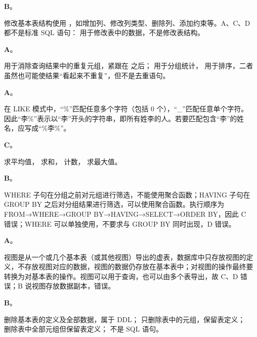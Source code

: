 \documentclass[a4paper,11pt]{article}
\begin{document}


\q \textbf{B}。\begin{analysis}修改基本表结构使用 ，如增加列、修改列类型、删除列、添加约束等。A、C、D 都不是标准 SQL 语句： 用于修改表中的数据，不是修改表结构。\end{analysis}

\q \textbf{A}。\begin{analysis} 用于消除查询结果中的重复元组，紧跟在  之后； 用于分组统计， 用于排序，二者虽然也可能使结果“看起来不重复”，但不是去重语句。\end{analysis}

\q \textbf{A}。\begin{analysis}在 LIKE 模式中，“\%”匹配任意多个字符（包括 0 个），“\_”匹配任意单个字符。因此“李\%”表示以“李”开头的字符串，即所有姓李的人。若要匹配包含“李”的姓名，应写成“\%李\%”。\end{analysis}

\q \textbf{C}。\begin{analysis} 求平均值， 求和， 计数， 求最大值。\end{analysis}

\q \textbf{B}。\begin{analysis}WHERE 子句在分组之前对元组进行筛选，不能使用聚合函数；HAVING 子句在 GROUP BY 之后对分组结果进行筛选，可以使用聚合函数。执行顺序为 FROM→WHERE→GROUP BY→HAVING→SELECT→ORDER BY，因此 C 错误；WHERE 可以单独使用，不要求与 GROUP BY 同时出现，D 错误。\end{analysis}

\q \textbf{A}。\begin{analysis}视图是从一个或几个基本表（或其他视图）导出的虚表，数据库中只存放视图的定义，不存放视图对应的数据，视图的数据仍存放在基本表中；对视图的操作最终要转换为对基本表的操作。视图可以用于查询，也可以由多个表导出，故 C、D 错误；B 说视图存放数据副本，错误。\end{analysis}

\q \textbf{B}。\begin{analysis} 删除基本表的定义及全部数据，属于 DDL； 只删除表中的元组，保留表定义； 删除表中全部元组但保留表定义； 不是 SQL 语句。\end{analysis}
\end{document}
